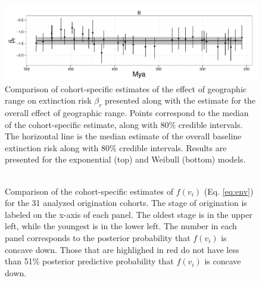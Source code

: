 \documentclass[12pt,letterpaper]{article}
\begin{document}
\begin{figure}[ht]
  \centering
  \includegraphics[height = 0.5\textheight,width=\textwidth,keepaspectratio=true]{figure/range_cohort}
  \caption{Comparison of cohort-specific estimates of the effect of geographic range on extinction risk \(\beta_{r}\) presented along with the estimate for the overall effect of geographic range. Points correspond to the median of the cohort-specific estimate, along with 80\% credible intervals. The horizontal line is the median estimate of the overall baseline extinction risk along with 80\% credible intervals. Results are presented for the exponential (top) and Weibull (bottom) models.}
  \label{fig:cohort_range}
\end{figure}


\begin{figure}
  \centering
  \includegraphics[height = 0.5\textheight,width=\textwidth,keepaspectratio=true]{figure/cohort_quads}
  \caption{Comparison of the cohort-specific estimates of \(f(v_{i})\) (Eq. \ref{eq:env}) for the 31 analyzed origination cohorts. The stage of origination is labeled on the x-axis of each panel. The oldest stage is in the upper left, while the youngest is in the lower left. The number in each panel corresponds to the posterior probability that \(f(v_{i})\) is concave down. Those that are highlighed in red do not have less than 51\% posterior predictive probability that \(f(v_{i})\) is concave down.}
  \label{fig:env_cohort}
\end{figure}
\end{document}
